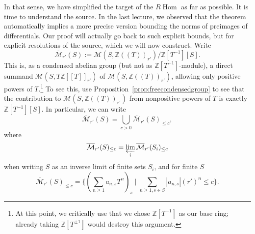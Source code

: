 \documentclass[11pt]{amsbook}
\DeclareMathOperator{\Hom}{Hom}
\numberwithin{equation}{section}
\numberwithin{theorem}{section}
\theoremstyle{definition}
\begin{document}
In that sense, we have simplified the target of the $R\Hom$ as far as possible. It is time to understand the source. In the last lecture, we observed that the theorem automatically implies a more precise version bounding the norms of preimages of differentials. Our proof will actually go back to such explicit bounds, but for explicit resolutions of the source, which we will now construct. Write
\[
\overline{\mathcal M}_{r'}(S) := \mathcal M(S,\mathbb Z((T))_{r'})/\mathbb Z[T^{-1}][S].
\]
This is, as a condensed abelian group (but not as $\mathbb Z[T^{-1}]$-module), a direct summand $\mathcal M(S,T\mathbb Z[[T]]_{r'})$ of $\mathcal M(S,\mathbb Z((T))_{r'})$, allowing only positive powers of $T$.\footnote{At this point, we critically use that we chose $\mathbb Z[T^{-1}]$ as our base ring; already taking $\mathbb Z[T^{\pm 1}]$ would destroy this argument.} To see this, use Proposition~\ref{prop:freecondensedgroup} to see that the contribution to $\mathcal M(S,\mathbb Z((T))_{r'})$ from nonpositive powers of $T$ is exactly $\mathbb Z[T^{-1}][S]$. In particular, we can write
\[
\overline{\mathcal M}_{r'}(S) = \bigcup_{c>0} \overline{\mathcal M}_{r'}(S)_{\leq c},
\]
where
\[
\overline{\mathcal M}_{r'}(S)_{\leq c} = \varprojlim_i \overline{\mathcal M}_{r'}(S_i)_{\leq c}
\]
when writing $S$ as an inverse limit of finite sets $S_i$, and for finite $S$
\[
	\overline{\mathcal M}_{r'}(S)_{\leq c} = \{(\sum_{n\geq 1} a_{n,s} T^n)_s\mid \sum_{n\geq 1,s\in S} |a_{n,s}|(r')^n\leq c\}.
\]
\end{document}
